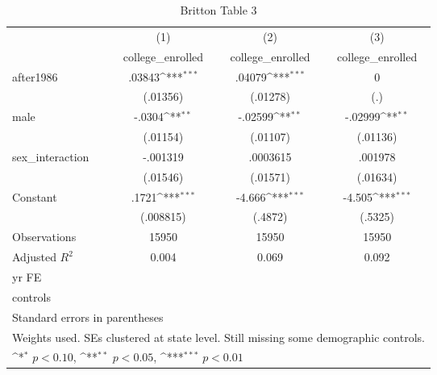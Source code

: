 \begin{table}[htbp]\centering
\def\sym#1{\ifmmode^{#1}\else\(^{#1}\)\fi}
\caption{Britton Table 3}
\begin{tabular}{l*{3}{c}}
\hline\hline
                    &\multicolumn{1}{c}{(1)}&\multicolumn{1}{c}{(2)}&\multicolumn{1}{c}{(3)}\\
                    &\multicolumn{1}{c}{college\_enrolled}&\multicolumn{1}{c}{college\_enrolled}&\multicolumn{1}{c}{college\_enrolled}\\
\hline
after1986           &      .03843\sym{***}&      .04079\sym{***}&           0         \\
                    &    (.01356)         &    (.01278)         &         (.)         \\
[1em]
male                &      -.0304\sym{**} &     -.02599\sym{**} &     -.02999\sym{**} \\
                    &    (.01154)         &    (.01107)         &    (.01136)         \\
[1em]
sex\_interaction     &    -.001319         &    .0003615         &     .001978         \\
                    &    (.01546)         &    (.01571)         &    (.01634)         \\
[1em]
Constant            &       .1721\sym{***}&      -4.666\sym{***}&      -4.505\sym{***}\\
                    &   (.008815)         &     (.4872)         &     (.5325)         \\
\hline
Observations        &       15950         &       15950         &       15950         \\
Adjusted \(R^{2}\)  &       0.004         &       0.069         &       0.092         \\
yr FE               &                     &                     &                     \\
controls            &                     &                     &                     \\
\hline\hline
\multicolumn{4}{l}{\footnotesize Standard errors in parentheses}\\
\multicolumn{4}{l}{\footnotesize Weights used. SEs clustered at state level. Still missing some demographic controls.}\\
\multicolumn{4}{l}{\footnotesize \sym{*} \(p<0.10\), \sym{**} \(p<0.05\), \sym{***} \(p<0.01\)}\\
\end{tabular}
\end{table}
